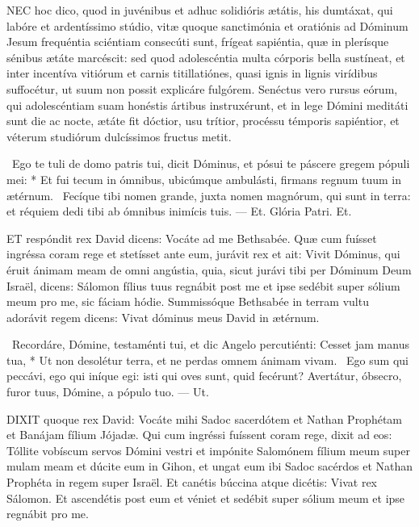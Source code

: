 \lettrine[lines=2]{N}{EC} hoc dico, quod in juvénibus et adhuc solidióris ætátis, his dumtáxat, qui labóre et ardentíssimo stúdio, vitæ quoque sanctimónia et oratiónis ad Dóminum Jesum frequéntia sciéntiam consecúti sunt, frígeat sapiéntia, quæ in plerísque sénibus ætáte marcéscit: sed quod adolescéntia multa córporis bella sustíneat, et inter incentíva vitiórum et carnis titillatiónes, quasi ignis in lignis virídibus suffocétur, ut suum non possit explicáre fulgórem. Senéctus vero rursus eórum, qui adolescéntiam suam honéstis ártibus instruxérunt, et in lege Dómini meditáti sunt die ac nocte, ætáte fit dóctior, usu trítior, procéssu témporis sapiéntior, et véterum studiórum dulcíssimos fructus metit.

\R\ Ego te tuli de domo patris tui, dicit Dóminus, et pósui te páscere gregem pópuli mei: * Et fui tecum in ómnibus, ubicúmque ambulásti, firmans regnum tuum in ætérnum. \V\ Fecíque tibi nomen grande, juxta nomen magnórum, qui sunt in terra: et réquiem dedi tibi ab ómnibus inimícis tuis. --- Et. Glória Patri. Et.





\lettrine[lines=2]{E}{T} respóndit rex David dicens: Vocáte ad me Bethsabée. Quæ cum fuísset ingréssa coram rege et stetísset ante eum, jurávit rex et ait: Vivit Dóminus, qui éruit ánimam meam de omni angústia, quia, sicut jurávi tibi per Dóminum Deum Israël, dicens: Sálomon fílius tuus regnábit post me et ipse sedébit super sólium meum pro me, sic fáciam hódie. Summissóque Bethsabée in terram vultu adorávit regem dicens: Vivat dóminus meus David in ætérnum.

\R\ Recordáre, Dómine, testaménti tui, et dic Angelo percutiénti: Cesset jam manus tua, * Ut non desolétur terra, et ne perdas omnem ánimam vivam. \V\ Ego sum qui peccávi, ego qui iníque egi: isti qui oves sunt, quid fecérunt? Avertátur, óbsecro, furor tuus, Dómine, a pópulo tuo. --- Ut.


\lettrine[lines=2]{D}{IXIT} quoque rex David: Vocáte mihi Sadoc sacerdótem et Nathan Prophétam et Banájam fílium Jójadæ. Qui cum ingréssi fuíssent coram rege, dixit ad eos: Tóllite vobíscum servos Dómini vestri et impónite Salomónem fílium meum super mulam meam et dúcite eum in Gihon, et ungat eum ibi Sadoc sacérdos et Nathan Prophéta in regem super Israël. Et canétis búccina atque dicétis: Vivat rex Sálomon. Et ascendétis post eum et véniet et sedébit super sólium meum et ipse regnábit pro me.

